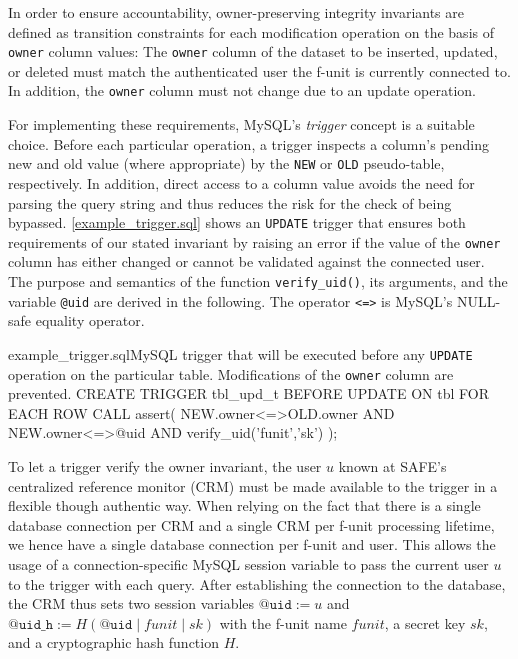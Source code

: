 \documentclass{src/acm_proc_article-sp} \else
\newcommand\SAFE{SAFE\xspace}
\begin{document}
In order to ensure accountability, owner-preserving integrity
invariants are defined as transition constraints for each
modification operation on the basis of \texttt{owner} column values:
The \texttt{owner} column of the dataset to be inserted, updated, or
deleted must match the authenticated user the f-unit is currently
connected to. In addition, the \texttt{owner} column must not change
due to an update operation.

For implementing these requirements, MySQL's \emph{trigger} concept
\cite{mysql-create-trigger} is a suitable choice. Before each
particular operation, a trigger inspects a column's pending new and
old value (where appropriate) by the \texttt{NEW} or \texttt{OLD}
pseudo-table, respectively. In addition, direct access to a column
value avoids the need for parsing the query string and thus reduces
the risk for the check of being bypassed.
\autoref{example_trigger.sql} shows an \texttt{UPDATE} trigger that
ensures both requirements of our stated invariant by raising an error
if the value of the \texttt{owner} column has either changed or
cannot be validated against the connected user. The purpose and
semantics of the function \texttt{verify\_uid()}, its arguments, and
the variable \texttt{@uid} are derived in the following. 
The operator \texttt{<=>} is MySQL's NULL-safe equality operator.
\begin{lstfloat}{example_trigger.sql}{MySQL trigger that will be executed before any \texttt{UPDATE} operation on the particular table. Modifications of the \texttt{owner} column are prevented.}
  CREATE TRIGGER tbl_upd_t BEFORE UPDATE ON tbl
    FOR EACH ROW CALL assert(
      NEW.owner<=>OLD.owner AND NEW.owner<=>@uid AND verify_uid('funit','sk')
    );
\end{lstfloat}

To let a trigger verify the owner invariant, the user $u$ known at
\SAFE's centralized reference monitor (CRM) must be made available to
the trigger in a flexible though authentic way. When relying on the
fact that there is a single database connection per CRM and a single
CRM per f-unit processing lifetime, we hence have a single database
connection per f-unit and user. This allows the usage of a
connection-specific MySQL session variable
\cite{mysql-user-variables} to pass the current user $u$ to the
trigger with each query. After establishing the connection to the
database, the CRM thus sets two session variables
$\mathtt{@uid} := \mathit{u}$ and
$\mathtt{@uid\_h} := H(\mathtt{@uid} \mid \mathit{funit} \mid \mathit{sk})$
with the f-unit name $\mathit{funit}$, a secret key $\mathit{sk}$, and a
cryptographic hash function $H$.
  
\end{document}
